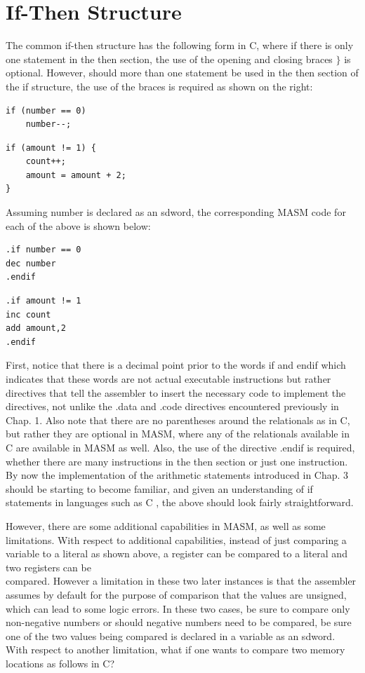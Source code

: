 \documentclass[10pt]{book}
\begin{document}
\section{If-Then Structure}
The common if-then structure has the following form in C, where if there is only one statement in the then section, the use of the opening and closing braces $\}$ is optional. However, should more than one statement be used in the then section of the if structure, the use of the braces is required as shown on the right:

\begin{verbatim}
if (number == 0)
    number--;
\end{verbatim}

\begin{verbatim}
if (amount != 1) {
    count++;
    amount = amount + 2;
}
\end{verbatim}

Assuming number is declared as an sdword, the corresponding MASM code for each of the above is shown below:

\begin{verbatim}
.if number == 0
dec number
.endif
\end{verbatim}

\begin{verbatim}
.if amount != 1
inc count
add amount,2
.endif
\end{verbatim}

First, notice that there is a decimal point prior to the words if and endif which indicates that these words are not actual executable instructions but rather directives that tell the assembler to insert the necessary code to implement the directives, not unlike the .data and .code directives encountered previously in Chap. 1. Also note that there are no parentheses around the relationals as in C, but rather they are optional in MASM, where any of the relationals available in C are available in MASM as well. Also, the use of the directive .endif is required, whether there are many instructions in the then section or just one instruction. By now the implementation of the arithmetic statements introduced in Chap. 3 should be starting to become familiar, and given an understanding of if statements in languages such as C , the above should look fairly straightforward.

However, there are some additional capabilities in MASM, as well as some limitations. With respect to additional capabilities, instead of just comparing a variable to a literal as shown above, a register can be compared to a literal and two registers can be\\
compared. However a limitation in these two later instances is that the assembler assumes by default for the purpose of comparison that the values are unsigned, which can lead to some logic errors. In these two cases, be sure to compare only non-negative numbers or should negative numbers need to be compared, be sure one of the two values being compared is declared in a variable as an sdword. With respect to another limitation, what if one wants to compare two memory locations as follows in C?
\end{document}
